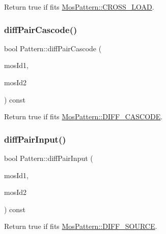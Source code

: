 Return true if fits \hyperlink{type_8h_af19eddb079bfea723256710b029c38e8a19ddbfeab78ac1a4bbe1a186828c5d8d}{Mos\+Pattern\+::\+C\+R\+O\+S\+S\+\_\+\+L\+O\+AD}. 

\mbox{\label{classPattern_ad59ebd9a536a170735daf63126d71dea}} 
\subsubsection{\texorpdfstring{diff\+Pair\+Cascode()}{diffPairCascode()}}
{\footnotesize\ttfamily bool Pattern\+::diff\+Pair\+Cascode (\begin{DoxyParamCaption}\item[{\hyperlink{type_8h_a581e8093e28e7362f2b6937296190676}{Index\+Type}}]{mos\+Id1,  }\item[{\hyperlink{type_8h_a581e8093e28e7362f2b6937296190676}{Index\+Type}}]{mos\+Id2 }\end{DoxyParamCaption}) const\hspace{0.3cm}{\ttfamily [private]}}



Return true if fits \hyperlink{type_8h_af19eddb079bfea723256710b029c38e8a1b7b3de4c92d42d8311e04be030655af}{Mos\+Pattern\+::\+D\+I\+F\+F\+\_\+\+C\+A\+S\+C\+O\+DE}. 

\mbox{\label{classPattern_a8e30aad375e98bbcdeab764705e68045}} 
\subsubsection{\texorpdfstring{diff\+Pair\+Input()}{diffPairInput()}}
{\footnotesize\ttfamily bool Pattern\+::diff\+Pair\+Input (\begin{DoxyParamCaption}\item[{\hyperlink{type_8h_a581e8093e28e7362f2b6937296190676}{Index\+Type}}]{mos\+Id1,  }\item[{\hyperlink{type_8h_a581e8093e28e7362f2b6937296190676}{Index\+Type}}]{mos\+Id2 }\end{DoxyParamCaption}) const\hspace{0.3cm}{\ttfamily [private]}}



Return true if fits \hyperlink{type_8h_af19eddb079bfea723256710b029c38e8ad45b64a7d6b85dde1b52dd5a18863933}{Mos\+Pattern\+::\+D\+I\+F\+F\+\_\+\+S\+O\+U\+R\+CE}. 

